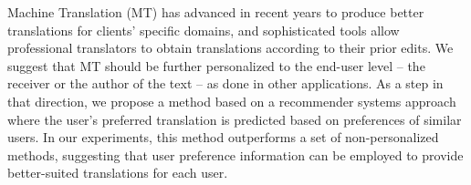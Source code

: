 Machine Translation (MT) has advanced in recent years to produce better translations for clients' specific domains, and sophisticated tools allow professional translators to obtain translations according to their prior edits. We suggest that MT should be further personalized to the end-user level -- the receiver or the author of the text -- as done in other applications. As a step in that direction, we propose a method based on a recommender systems approach where the user's preferred translation is predicted based on preferences of similar users. In our experiments, this method outperforms a set of non-personalized methods, suggesting that user preference information can be employed to provide better-suited translations for each user.
